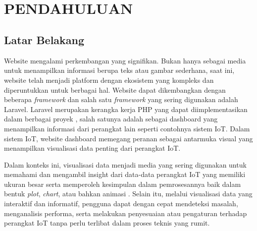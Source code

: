 \chapter[PENDAHULUAN]{\\ PENDAHULUAN}

\section{Latar Belakang}
Website mengalami perkembangan yang signifikan. Bukan hanya sebagai media untuk menampilkan informasi berupa teks atau gambar sederhana, saat ini, website telah menjadi platform dengan ekosistem yang kompleks dan diperuntukkan untuk berbagai hal. Website dapat dikembangkan dengan beberapa \textit{framework} dan salah satu \textit{framework} yang sering digunakan adalah Laravel. Laravel merupakan kerangka kerja PHP yang dapat diimplementasikan dalam berbagai proyek \cite{Endra2021}, salah satunya adalah sebagai dashboard yang menampilkan informasi dari perangkat lain seperti contohnya sistem IoT. Dalam sistem IoT, website dashboard memegang peranan sebagai antarmuka visual yang menampilkan visualisasi data penting dari perangkat IoT.

Dalam konteks ini, visualisasi data menjadi media yang sering digunakan untuk memahami dan mengambil insight dari data-data perangkat IoT yang memiliki ukuran besar serta memperoleh kesimpulan dalam pemrosesannya baik dalam bentuk \textit{plot}, \textit{chart}, atau bahkan animasi \cite{Mundargi2023}\cite{Bostrm2022}. Selain itu, melalui visualisasi data yang interaktif dan informatif, pengguna dapat dengan cepat mendeteksi masalah, menganalisis performa, serta melakukan penyesuaian atau pengaturan terhadap perangkat IoT tanpa perlu terlibat dalam proses teknis yang rumit. 

